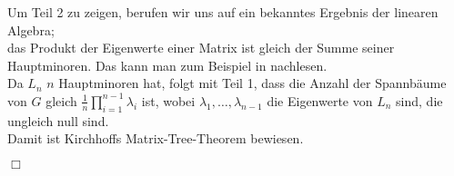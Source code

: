 Um Teil 2 zu zeigen, berufen wir uns auf ein bekanntes Ergebnis der linearen Algebra; \\
das Produkt der Eigenwerte einer Matrix ist gleich der Summe seiner Hauptminoren. Das kann man zum Beispiel in \cite{meyer_2005} nachlesen. \\
Da $L_n$ $n$ Hauptminoren hat, folgt mit Teil 1, dass die Anzahl der Spannbäume von $G$ gleich $\frac{1}{n}\prod_{i=1}^{n-1}\lambda_i$ ist, wobei $\lambda_1,\ldots,\lambda_{n-1}$ die Eigenwerte von $L_n$ sind, die ungleich null sind. \\
Damit ist Kirchhoffs Matrix-Tree-Theorem bewiesen.
\begin{flushright} $\Box$ \end{flushright} 
 
